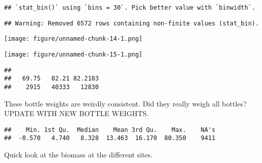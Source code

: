 \documentclass[]{article}
\newenvironment{Shaded}{\begin{snugshade}}{\end{snugshade}}
\newcommand{\KeywordTok}[1]{\textcolor[rgb]{0.13,0.29,0.53}{\textbf{#1}}}
\newcommand{\NormalTok}[1]{#1}
\newcommand{\OperatorTok}[1]{\textcolor[rgb]{0.81,0.36,0.00}{\textbf{#1}}}
\begin{document}
\begin{verbatim}
## `stat_bin()` using `bins = 30`. Pick better value with `binwidth`.
\end{verbatim}

\begin{verbatim}
## Warning: Removed 6572 rows containing non-finite values (stat_bin).
\end{verbatim}

\texttt{[image: figure/unnamed-chunk-14-1.png]}

\begin{Shaded}
\end{Shaded}

\texttt{[image: figure/unnamed-chunk-15-1.png]}

\begin{Shaded}
\end{Shaded}

\begin{verbatim}
## 
##   69.75   82.21 82.2103 
##    2915   40333   12830
\end{verbatim}

These bottle weights are weirdly consistent. Did they really weigh all
bottles? UPDATE WITH NEW BOTTLE WEIGHTS.

\begin{Shaded}
\end{Shaded}

\begin{verbatim}
##    Min. 1st Qu.  Median    Mean 3rd Qu.    Max.    NA's 
##  -0.570   4.740   8.328  13.463  16.170  80.350    9411
\end{verbatim}

Quick look at the biomass at the different sites.
\end{document}

